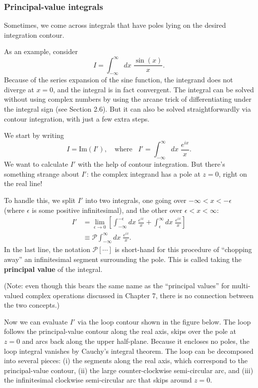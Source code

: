 \documentclass[10pt,a4paper]{article}
\begin{document}
\subsubsection{Principal-value integrals}
\label{principal-value-integrals}

Sometimes, we come across integrals that have poles lying on the
desired integration contour.

As an example, consider
\begin{equation}
I = \int_{-\infty}^\infty dx\; \frac{\sin(x)}{x}.
\end{equation}
Because of the series expansion of the sine function, the integrand
does not diverge at $x = 0$, and the integral is in fact
convergent. The integral can be solved without using complex numbers
by using the arcane trick of differentiating under the integral sign
(see Section 2.6). But it can also be solved straightforwardly via
contour integration, with just a few extra steps.

We start by writing
\begin{equation}
I = \mathrm{Im}(I'), \quad \mathrm{where}\;\;\; I' = \int_{-\infty}^\infty dx\; \frac{e^{ix}}{x}.
\end{equation}
We want to calculate $I'$ with the help of contour integration. But
there's something strange about $I'$: the complex integrand has a pole
at $z = 0$, right on the real line!

To handle this, we split $I'$ into two integrals, one going over
$-\infty < x < -\epsilon$ (where $\epsilon$ is some positive
infinitesimal), and the other over $\epsilon < x < \infty$:
\begin{align}
  I' &= \lim_{\epsilon \rightarrow 0} \left[ \int_{-\infty}^{-\epsilon} dx\; \frac{e^{ix}}{x} + \int_{\epsilon}^\infty dx\; \frac{e^{ix}}{x}\right] \\
  &\equiv \mathcal{P} \int_{-\infty}^\infty dx\; \frac{e^{ix}}{x}.
\end{align}
In the last line, the notation $\mathcal{P}[\cdots]$ is short-hand for
this procedure of ``chopping away'' an infinitesimal segment
surrounding the pole. This is called taking the \textbf{principal
  value} of the integral.

(Note: even though this bears the same name as the ``principal
values'' for multi-valued complex operations discussed in Chapter 7,
there is no connection between the two concepts.)

Now we can evaluate $I'$ via the loop contour shown in the figure
below. The loop follows the principal-value contour along the real
axis, skips over the pole at $z = 0$ and arcs back along the upper
half-plane. Because it encloses no poles, the loop integral vanishes
by Cauchy's integral theorem.  The loop can be decomposed into several
pieces: (i) the segments along the real axis, which correspond to the
principal-value contour, (ii) the large counter-clockwise
semi-circular arc, and (iii) the infinitesimal clockwise semi-circular
arc that skips around $z = 0$.
\end{document}
